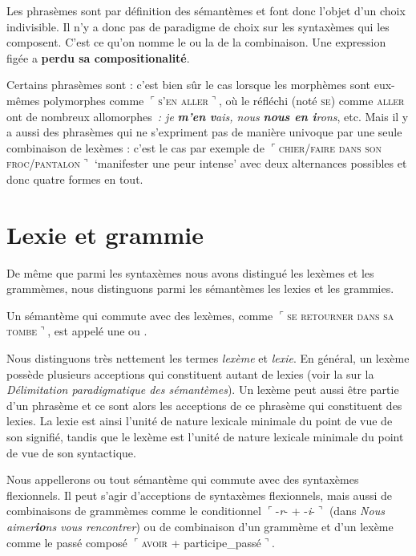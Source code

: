 Les phrasèmes sont par définition des sémantèmes et font donc l’objet d’un choix indivisible. Il n’y a donc pas de paradigme de choix sur les syntaxèmes qui les composent. C’est ce qu’on nomme le  ou la  de la combinaison. Une expression figée a \textbf{perdu sa compositionalité}.

Certains phrasèmes sont : c’est bien sûr le cas lorsque les morphèmes sont eux-mêmes polymorphes comme $⌜$\textsc{s’en} \textsc{aller}$⌝$, où le réfléchi (noté \textsc{se}) comme \textsc{aller} ont de nombreux allomorphes~\textit{: je} \textbf{\textit{m’en} \textit{v}}\textit{ais, nous} \textbf{\textit{nous en i}}\textit{rons}, etc. Mais il y a aussi des phrasèmes qui ne s’expriment pas de manière univoque par une seule combinaison de lexèmes : c’est le cas par exemple de $⌜$\textsc{chier/faire} \textsc{dans} \textsc{son} \textsc{froc/pantalon}$⌝$ ‘manifester une peur intense’ avec deux alternances possibles et donc quatre formes en tout.

\section{Lexie et grammie}\label{sec:2.3.8}

De même que parmi les syntaxèmes nous avons distingué les lexèmes et les grammèmes, nous distinguons parmi les sémantèmes les lexies et les grammies.

Un sémantème qui commute avec des lexèmes, comme $⌜$\textsc{se} \textsc{retourner} \textsc{dans} \textsc{sa} \textsc{tombe}$⌝$, est appelé une  ou .

Nous distinguons très nettement les termes \textit{lexème} et \textit{lexie}. En général, un lexème possède plusieurs acceptions qui constituent autant de lexies (voir la  sur la \textit{Délimitation paradigmatique des sémantèmes}). Un lexème peut aussi être partie d’un phrasème et ce sont alors les acceptions de ce phrasème qui constituent des lexies. La lexie est ainsi l’unité de nature lexicale minimale du point de vue de son signifié, tandis que le lexème est l’unité de nature lexicale minimale du point de vue de son syntactique.

Nous appellerons  ou  tout sémantème qui commute avec des syntaxèmes flexionnels. Il peut s’agir d’acceptions de syntaxèmes flexionnels, mais aussi de combinaisons de grammèmes comme le conditionnel  $⌜${}-\textit{r}{}- + -\textit{i}{}-$⌝$ (dans \textit{Nous aimer}\textbf{\textit{io}}\textit{ns vous rencontrer}) ou de combinaison d’un grammème et d’un lexème comme le passé composé $⌜$\textsc{avoir} + participe\_passé$⌝$.

